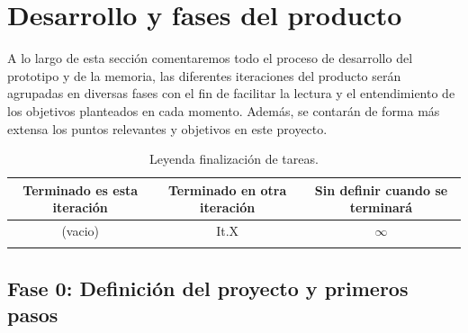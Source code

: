 \chapter{Desarrollo y fases del producto}
A lo largo de esta sección comentaremos todo el proceso de desarrollo del prototipo y de la 
memoria, las diferentes iteraciones del producto serán agrupadas en diversas fases con el fin
de facilitar la lectura y el entendimiento de los objetivos planteados en cada momento. Además,
se contarán de forma más extensa los puntos relevantes y objetivos en este proyecto.

\begin{longtable}[c]{|c|c|c|}
\hline
Terminado es esta iteración & Terminado en otra iteración & Sin definir cuando se terminará \\ 
\hline
			(vacio)			&             It.X            &             $\infty$            \\ 
\hline
\caption{Leyenda finalización de tareas.}
\end{longtable}

\section{Fase 0: Definición del proyecto y primeros pasos}

